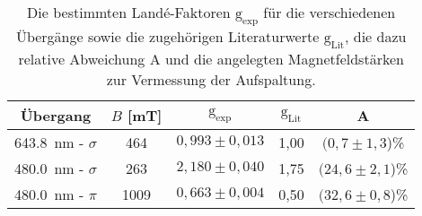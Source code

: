     \begin{table}[h]
        \centering
        \caption{Die bestimmten Landé-Faktoren $\text{g}_{\text{exp}}$ für die verschiedenen Übergänge sowie die zugehörigen Literaturwerte $\text{g}_{\text{Lit}}$, die dazu relative Abweichung A und die angelegten Magnetfeldstärken zur Vermessung der Aufspaltung.}
        \label{tab:blau_pi}
    
        \begin{tabular}{c c c c c}
          \toprule
          {Übergang} & {$B$ [mT]} & {$\text{g}_{\text{exp}}$} & {$\text{g}_{\text{Lit}}$} & {A} \\ 
          \midrule
           \SI{643.8}{\nano\metre} - $\sigma$  & 464  & $0,993\pm0,013$  &   1,00      &  $(0,7\pm1,3$)\% \\
           \SI{480.0}{\nano\metre} - $\sigma$ & 263   & $2,180\pm0,040$  &   1,75      &  $(24,6\pm2,1$)\% \\
           \SI{480.0}{\nano\metre} - $\pi$    & 1009  & $0,663\pm0,004$  &   0,50      &  $(32,6\pm0,8$)\% \\

          \bottomrule
        \end{tabular}
      \end{table}
      \FloatBarrier
    
    
